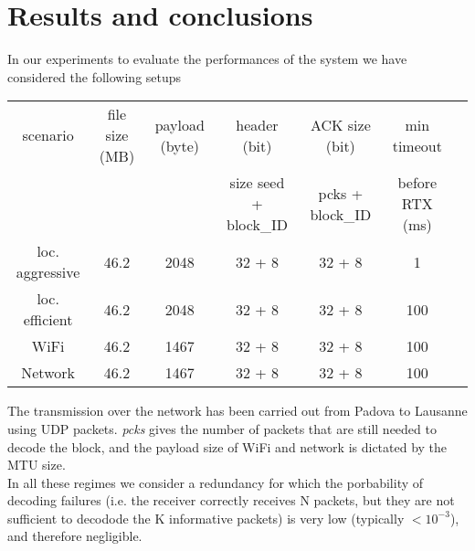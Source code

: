 \section{Results and conclusions}
\setlength{\abovecaptionskip}{0pt plus 0pt minus 2pt}



In our experiments to evaluate the performances of the system we have considered the following setups
\begin{center}
\begin{tabular}{ccccccc}

\toprule
scenario&file size (MB)& payload (byte) &header  (bit) &ACK size (bit)&min timeout\\
& & &size seed + block\_ID&pcks + block\_ID& before RTX (ms) \\
\midrule
loc. aggressive&46.2&2048&32 + 8&32 + 8&1\\
loc. efficient&46.2&2048&32 + 8&32 + 8&100\\
WiFi&46.2&1467&32 + 8&32 + 8&100\\
Network&46.2&1467&32 + 8&32 + 8&100\\
\bottomrule
\end{tabular}
\end{center}
The transmission over the network has been carried out from Padova to Lausanne using UDP packets. \emph{pcks} gives the number of packets that are still needed to decode the block, and the payload size of WiFi and network is dictated by the MTU size. \\
In all these regimes we consider a redundancy for which the porbability of decoding failures (i.e. the receiver correctly receives N packets, but they are not sufficient to decodode the K informative packets) is very low (typically $<10^{-3}$), and therefore negligible. \\
